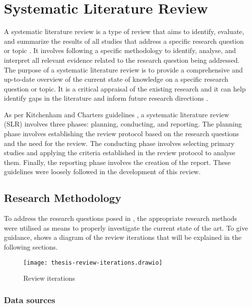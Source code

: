\section{Systematic Literature Review}

A systematic literature review is a type of review that aims to identify,
evaluate, and summarize the results of all studies that address a specific
research question or topic
\cite{kitchenham2007guidelines,kitchenham2009systematic,gough2017introduction}.
It involves following a specific methodology to identify, analyse, and
interpret all relevant evidence related to the research question being
addressed. The purpose of a systematic literature review is to provide a
comprehensive and up-to-date overview of the current state of knowledge on a
specific research question or topic. It is a critical appraisal of the existing
research and it can help identify gaps in the literature and inform future
research directions \cite{kitchenham2007guidelines}.

As per Kitchenham and Charters guidelines \cite{kitchenham2007guidelines}, a
systematic literature review (SLR) involves three phases: planning, conducting,
and reporting. The planning phase involves establishing the review protocol
based on the research questions and the need for the review. The conducting
phase involves selecting primary studies and applying the criteria established
in the review protocol to analyse them. Finally, the reporting phase involves
the creation of the report. These guidelines were loosely followed in the
development of this review.

\subsection{Research Methodology} \label{sub:research-methodology}

To address the research questions posed in , the
appropriate research methods were utilised as means to properly investigate the
current state of the art. To give guidance,
 shows a diagram of the review iterations that will
be explained in the following sections.

\begin{figure*}[!htb]
  \caption{Review iterations}
  \label{fig:review-iterations}
  \centering
  \texttt{[image: thesis-review-iterations.drawio]}
\end{figure*}

\subsubsection{Data sources}

